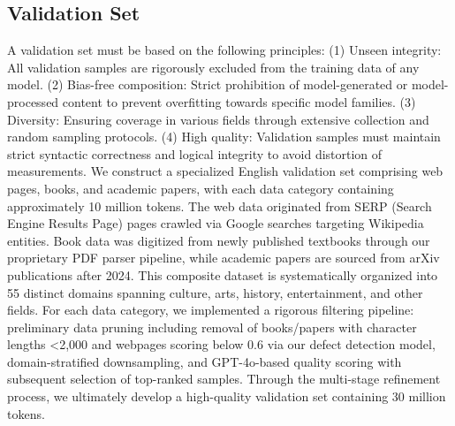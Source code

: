 \documentclass{article}
\begin{document}
\subsection{Validation Set}
A validation set must be based on the following principles: (1) Unseen integrity: All validation samples are rigorously excluded from the training data of any model. (2) Bias-free composition: Strict
prohibition of model-generated or model-processed content to prevent overfitting towards specific model families. (3) Diversity: Ensuring coverage in various fields through extensive collection and random sampling protocols. (4) High quality: Validation samples must maintain strict syntactic correctness and logical integrity to avoid distortion of measurements.
We construct a specialized English validation set comprising web pages, books, and academic papers, with each data category containing approximately 10 million tokens. The web data originated from SERP (Search Engine Results Page) pages crawled via Google searches targeting Wikipedia entities. Book data was digitized from newly published textbooks through our proprietary PDF parser pipeline, while academic papers are sourced from arXiv publications after 2024. This composite dataset is systematically organized into 55 distinct domains spanning culture, arts, history, entertainment, and other fields.
For each data category, we implemented a rigorous filtering pipeline: preliminary data pruning including removal of books/papers with character lengths <2,000 and webpages scoring below 0.6 via our defect detection model, domain-stratified downsampling, and GPT-4o-based quality scoring with subsequent selection of top-ranked samples.
Through the multi-stage refinement process, we ultimately develop a high-quality validation set containing 30 million tokens.
\end{document}
